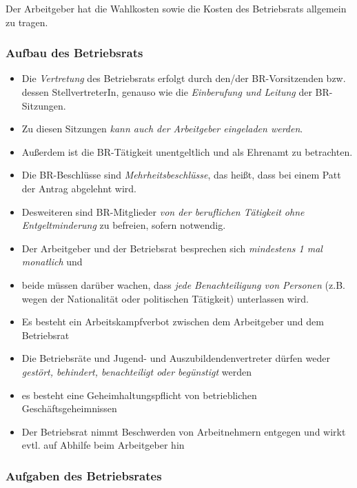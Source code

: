 \documentclass[a4paper, 12pt]{report}
\begin{document}
Der Arbeitgeber hat die Wahlkosten sowie die Kosten des Betriebsrats allgemein
zu tragen. \\

\subsubsection{Aufbau des Betriebsrats}

\begin{itemize}
    \item Die \emph{Vertretung} des Betriebsrats erfolgt durch den/der 
        BR-Vorsitzenden bzw. dessen StellvertreterIn, genauso wie die 
        \emph{Einberufung und Leitung} der BR-Sitzungen. 
    \item Zu diesen Sitzungen \emph{kann auch der Arbeitgeber eingeladen 
        werden}. 
    \item Außerdem ist die BR-Tätigkeit unentgeltlich und als Ehrenamt zu 
        betrachten. 
    \item Die BR-Beschlüsse sind \emph{Mehrheitsbeschlüsse}, das heißt, 
        dass bei einem Patt der Antrag abgelehnt wird. 
    \item Desweiteren sind BR-Mitglieder \emph{von der beruflichen Tätigkeit 
        ohne Entgeltminderung} zu befreien, sofern notwendig. 
    \item Der Arbeitgeber und der Betriebsrat besprechen sich \emph{mindestens 
        1 mal monatlich} und 
    \item beide müssen darüber wachen, dass \emph{jede Benachteiligung von 
        Personen} (z.B. wegen der Nationalität oder politischen Tätigkeit) 
        unterlassen wird. 
    \item Es besteht ein Arbeitskampfverbot zwischen dem Arbeitgeber und dem 
        Betriebsrat
    \item Die Betriebsräte und Jugend- und Auszubildendenvertreter dürfen weder 
        \emph{gestört, behindert, benachteiligt oder begünstigt} werden
    \item es besteht eine Geheimhaltungspflicht von betrieblichen 
        Geschäftsgeheimnissen
    \item Der Betriebsrat nimmt Beschwerden von Arbeitnehmern entgegen und wirkt
        evtl. auf Abhilfe beim Arbeitgeber hin
\end{itemize}

\subsubsection{Aufgaben des Betriebsrates}
\end{document}
